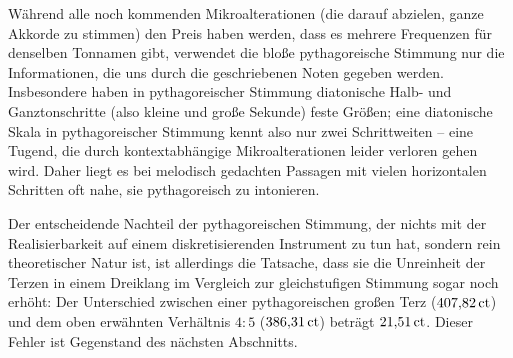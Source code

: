 Während alle noch kommenden Mikroalterationen (die darauf abzielen, ganze
Akkorde zu stimmen) den Preis haben werden, dass es mehrere Frequenzen für
denselben Tonnamen gibt, verwendet die bloße pythagoreische Stimmung nur die
Informationen, die uns durch die geschriebenen Noten gegeben werden.
Insbesondere haben in pythagoreischer Stimmung diatonische Halb- und
Ganztonschritte (also kleine und große Sekunde) feste Größen; eine diatonische
Skala in pythagoreischer Stimmung kennt also nur zwei Schrittweiten – eine
Tugend, die durch kontextabhängige Mikroalterationen leider verloren gehen wird.
Daher liegt es bei melodisch gedachten Passagen mit vielen horizontalen
Schritten oft nahe, sie pythagoreisch zu intonieren.

Der entscheidende Nachteil der pythagoreischen Stimmung, der nichts mit der
Realisierbarkeit auf einem diskretisierenden Instrument zu tun hat, sondern rein
theoretischer Natur ist, ist allerdings die Tatsache, dass sie die Unreinheit
der Terzen in einem Dreiklang im Vergleich zur gleichstufigen Stimmung sogar
noch erhöht: Der Unterschied zwischen einer pythagoreischen großen Terz
($407{,}82\,\text{ct}$) und dem oben erwähnten Verhältnis $4:5$
($386{,}31\,\text{ct}$) beträgt $21{,}51\,\text{ct}$. Dieser Fehler ist Gegenstand
des nächsten Abschnitts.

